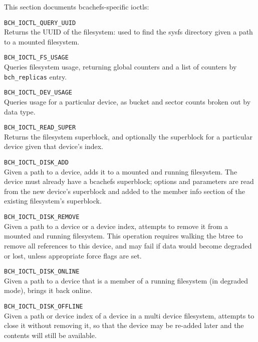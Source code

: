 \documentclass{article}
\begin{document}
This section documents bcachefs-specific ioctls:

\begin{description}
	\item \texttt{BCH\_IOCTL\_QUERY\_UUID} \\
		Returns the UUID of the filesystem: used to find the sysfs
		directory given a path to a mounted filesystem.

	\item \texttt{BCH\_IOCTL\_FS\_USAGE} \\
		Queries filesystem usage, returning global counters and a list
		of counters by \texttt{bch\_replicas} entry.

	\item \texttt{BCH\_IOCTL\_DEV\_USAGE} \\
		Queries usage for a particular device, as bucket and sector
		counts broken out by data type.

	\item \texttt{BCH\_IOCTL\_READ\_SUPER} \\
		Returns the filesystem superblock, and optionally the superblock
		for a particular device given that device's index.

	\item \texttt{BCH\_IOCTL\_DISK\_ADD} \\
		Given a path to a device, adds it to a mounted and running
		filesystem. The device must already have a bcachefs superblock;
		options and parameters are read from the new device's superblock
		and added to the member info section of the existing
		filesystem's superblock.

	\item \texttt{BCH\_IOCTL\_DISK\_REMOVE} \\
		Given a path to a device or a device index, attempts to remove
		it from a mounted and running filesystem. This operation
		requires walking the btree to remove all references to this
		device, and may fail if data would become degraded or lost,
		unless appropriate force flags are set.

	\item \texttt{BCH\_IOCTL\_DISK\_ONLINE} \\
		Given a path to a device that is a member of a running
		filesystem (in degraded mode), brings it back online.

	\item \texttt{BCH\_IOCTL\_DISK\_OFFLINE} \\
		Given a path or device index of a device in a multi device
		filesystem, attempts to close it without removing it, so that
		the device may be re-added later and the contents will still be
		available.


\end{description}
\end{document}
